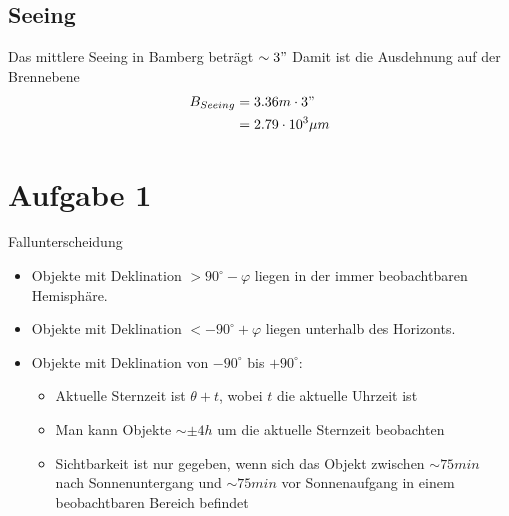 \documentclass[titlepage]{scrartcl}
\begin{document}
\subsection{Seeing}
Das mittlere Seeing in Bamberg beträgt $\sim3 "$ 
Damit ist die Ausdehnung auf der Brennebene
\begin{align*}
B_{Seeing}&=3.36m \cdot 3"\\
&= 2.79 \cdot 10^3 \mu m
\end{align*}
\section{Aufgabe 1}
Fallunterscheidung
\begin{itemize}
\item Objekte mit Deklination  $> 90^\circ - \varphi$ liegen in der immer beobachtbaren Hemisphäre.
\item Objekte mit Deklination $< - 90^\circ + \varphi$ liegen unterhalb des Horizonts.
\item Objekte mit Deklination von $-90^\circ$ bis $+90^\circ$:
\begin{itemize}
\item Aktuelle Sternzeit ist $\theta + t$, wobei $t$ die aktuelle Uhrzeit ist
\item Man kann Objekte $\sim\pm 4 h$ um die aktuelle Sternzeit beobachten
\item Sichtbarkeit ist nur gegeben, wenn sich das Objekt zwischen $\sim 75 min$ nach Sonnenuntergang und $\sim 75 min$ vor Sonnenaufgang in einem beobachtbaren Bereich befindet
\end{itemize}
\end{itemize}
\end{document}
